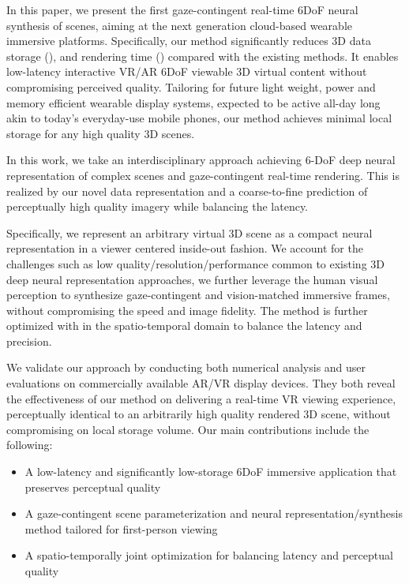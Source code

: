 
In this paper, we present the first gaze-contingent real-time 6DoF neural synthesis of scenes, aiming at the next generation cloud-based wearable immersive platforms.
Specifically, our method significantly reduces 3D data storage (), and rendering time () compared with the existing methods. It enables low-latency interactive VR/AR 6DoF viewable 3D virtual content without compromising perceived quality. Tailoring for future light weight, power and memory efficient wearable display systems, expected to be active all-day long akin to today's everyday-use mobile phones, our method achieves minimal local storage for any high quality 3D scenes. 


In this work, we take an interdisciplinary approach achieving 6-DoF deep neural representation of complex scenes and gaze-contingent real-time rendering. This is realized by our novel data representation and a coarse-to-fine prediction of perceptually high quality imagery while balancing the latency. 


Specifically, we represent an arbitrary virtual 3D scene as a compact neural representation in a viewer centered inside-out fashion. 
We account for the challenges such as low quality/resolution/performance common to existing 3D deep neural representation approaches, we further leverage the human visual perception to synthesize gaze-contingent and vision-matched immersive frames, without compromising the speed and image fidelity. 
The method is further optimized with in the spatio-temporal domain to balance the latency and precision.


We validate our approach by conducting both numerical analysis and user evaluations on commercially available AR/VR display devices. They both reveal the effectiveness of our method on delivering a real-time VR viewing experience, perceptually identical to an arbitrarily high quality rendered 3D scene, without compromising on local storage volume. Our main contributions include the following:
\begin{itemize}
    \item A low-latency and significantly low-storage 6DoF immersive application that preserves perceptual quality
    \item A gaze-contingent scene parameterization and neural representation/synthesis method tailored for first-person viewing
    \item A spatio-temporally joint optimization for balancing latency and perceptual quality
\end{itemize}
